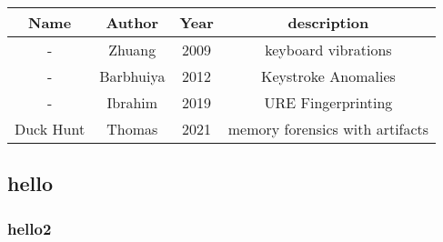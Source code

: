 \begin{center}
\begin{tabular}{|c c c c|}
    \hline
    Name & Author & Year & description \\ [0.5ex] 
    \hline \hline
    - & Zhuang \cite{zhuangKeyboardAcousticEmanations2009} & 2009 & keyboard vibrations \\
    \hline
    - & Barbhuiya \cite{barbhuiyaAnomalyBasedApproach2012} & 2012 & Keystroke Anomalies \\
    \hline
    - & Ibrahim \cite{ibrahimRFDNAFingerprintingDetection2019} & 2019 & URE Fingerprinting\\
    \hline
    Duck Hunt & Thomas \cite{thomasDuckHuntMemory2021} & 2021 & memory forensics with artifacts \\
    \hline
\end{tabular}
\end{center}



\subsection{hello}

\subsubsection{hello2}

